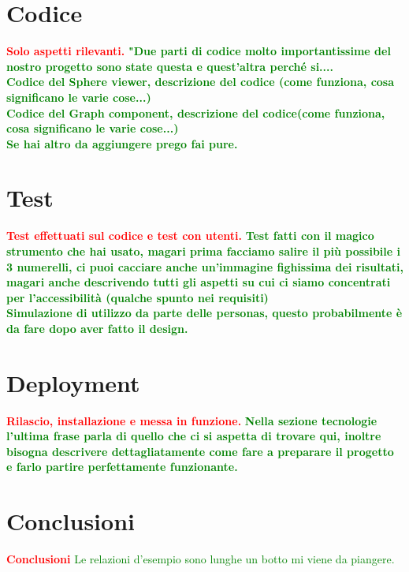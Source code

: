 \documentclass{article}
\begin{document}
\section{Codice}
\textcolor{red}{\textbf{Solo aspetti rilevanti.}}
\textcolor{green}{\textbf{"Due parti di codice molto importantissime del nostro progetto sono state questa e quest'altra perché si.... \\Codice del Sphere viewer, descrizione del codice (come funziona, cosa significano le varie cose...)\\Codice del Graph component, descrizione del codice(come funziona, cosa significano le varie cose...)\\Se hai altro da aggiungere prego fai pure.}}

\section{Test}
\textcolor{red}{\textbf{Test effettuati sul codice e test con utenti.}}
\textcolor{green}{\textbf{Test fatti con il magico strumento che hai usato, magari prima facciamo salire il più possibile i 3 numerelli, ci puoi cacciare anche un'immagine fighissima dei risultati, magari anche descrivendo tutti gli aspetti su cui ci siamo concentrati per l'accessibilità (qualche spunto nei requisiti)\\Simulazione di utilizzo da parte delle personas, questo probabilmente è da fare dopo aver fatto il design.}}

\section{Deployment}\label{sec:deploy}
\textcolor{red}{\textbf{Rilascio, installazione e messa in funzione.}}
\textcolor{green}{\textbf{Nella sezione tecnologie l'ultima frase parla di quello che ci si aspetta di trovare qui, inoltre bisogna descrivere dettagliatamente come fare a preparare il progetto e farlo partire perfettamente funzionante.}}

\section{Conclusioni}
\textcolor{red}{\textbf{Conclusioni}}
\textcolor{green}{Le relazioni d'esempio sono lunghe un botto mi viene da piangere.}



\end{document}
